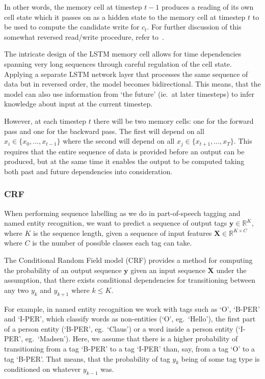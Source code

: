 In other words, the memory cell at timestep $t-1$ produces a reading of its own
cell state which it passes on as a hidden state to the memory cell at timestep
$t$ to be used to compute the candidate write for $c_{t}$. For further
discussion of this somewhat reversed read/write procedure, refer
to~\cite{pitis2016lstm}.

The intricate design of the LSTM memory cell allows for time dependencies
spanning very long sequences through careful regulation of the cell state.
Applying a separate LSTM network layer that processes the same sequence of data
but in reversed order, the model becomes bidirectional. This means, that the
model can also use information from `the future' (ie.\ at later timesteps) to
infer knowledge about input at the current timestep.

However, at each timestep $t$ there will be two memory cells: one for the
forward pass and one for the backward pass. The first will depend on all $x_{i}
\in \{x_{0}, \ldots, x_{t-1}\}$ where the second will depend on all $x_{j} \in
\{x_{t+1}, \ldots, x_{T}\}$. This requires that the entire sequence of data is
provided before an output can be produced, but at the same time it enables the
output to be computed taking both past and future dependencies into
consideration.


\subsubsection{CRF}\label{sec:setup-models-crf}

When performing sequence labelling as we do in part-of-speech tagging and named
entity recognition, we want to predict a sequence of output tags $\bm{y} \in
\mathbb{R}^{K}$, where $K$ is the sequence length, given a sequence of input
features $\bm{X} \in \mathbb{R}^{K \times C}$ where $C$ is the number of
possible classes each tag can take.

The Conditional Random Field model (CRF) provides a method for computing the
probability of an output sequence $\bm{y}$ given an input sequence $\bm{X}$
under the assumption, that there exists conditional dependencies for
transitioning between any two $y_{k}$ and $y_{k+1}$ where $k \leq K$.

For example, in named entity recognition we work with tags such as `O', `B-PER'
and `I-PER', which classify words as non-entities (`O', eg.\ `Hello'), the first
part of a person entity (`B-PER', eg.\ `Claus') or a word inside a person entity
(`I-PER', eg.\ `Madsen'). Here, we assume that there is a higher probability of
transitioning from a tag `B-PER' to a tag `I-PER' than, say, from a tag `O' to a
tag `B-PER'.  That means, that the probability of tag $y_{k}$ being of some tag
type is conditioned on whatever $y_{k-1}$ was.


